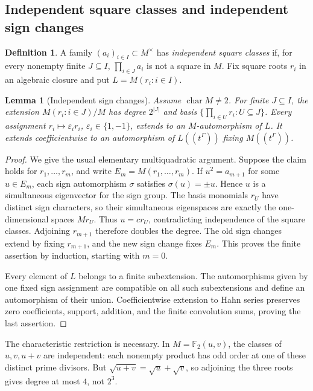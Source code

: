 \documentclass[11pt,a4paper]{article}
\numberwithin{equation}{section}
\newtheorem{lemma}[theorem]{Lemma}
\theoremstyle{definition}
\newtheorem{definition}[theorem]{Definition}
\theoremstyle{remark}
\begin{document}
\subsection{Independent square classes and independent sign changes}
\begin{definition}
A family $(a_i)_{i\in I}\subset M^\times$ has \emph{independent square
classes} if, for every nonempty finite $J\subseteq I$,
$\prod_{i\in J}a_i$ is not a square in $M$.
Fix square roots $r_i$ in an algebraic closure and put
$L=M(r_i:i\in I)$.
\end{definition}

\begin{lemma}[Independent sign changes]\label{tail:lem:signs}
Assume $\operatorname{char}M\ne2$. For finite $J\subseteq I$, the extension
$M(r_i:i\in J)/M$ has degree
$2^{|J|}$ and basis $\{\prod_{i\in U}r_i:U\subseteq J\}$.
Every assignment $r_i\mapsto\varepsilon_i r_i$, $\varepsilon_i\in\{1,-1\}$,
extends to an $M$-automorphism of $L$. It extends coefficientwise to an
automorphism of $L((t^\Gamma))$ fixing $M((t^\Gamma))$.
\end{lemma}
\begin{proof}
We give the usual elementary multiquadratic argument. Suppose the claim
holds for $r_1,\ldots,r_m$, and write $E_m=M(r_1,\ldots,r_m)$.
If $u^2=a_{m+1}$ for some $u\in E_m$, each sign automorphism $\sigma$
satisfies $\sigma(u)=\pm u$. Hence $u$ is a simultaneous eigenvector for
the sign group. The basis monomials $r_U$ have distinct sign characters,
so their simultaneous eigenspaces are exactly the one-dimensional spaces
$Mr_U$. Thus $u=cr_U$, contradicting independence of the square classes.
Adjoining $r_{m+1}$ therefore doubles the degree. The old sign changes
extend by fixing $r_{m+1}$, and the new sign change fixes $E_m$.
This proves the finite assertion by induction, starting with $m=0$.

Every element of $L$ belongs to a finite subextension. The automorphisms
given by one fixed sign assignment are compatible on all such
subextensions and define an automorphism of their union. Coefficientwise
extension to Hahn series preserves zero coefficients, support,
addition, and the finite convolution sums, proving the last assertion.
\end{proof}

The characteristic restriction is necessary. In $M=\mathbb F_2(u,v)$,
the classes of $u,v,u+v$ are independent: each nonempty product has odd
order at one of these distinct prime divisors. But
$\sqrt{u+v}=\sqrt u+\sqrt v$, so adjoining the three roots gives degree
at most $4$, not $2^3$.
\end{document}
